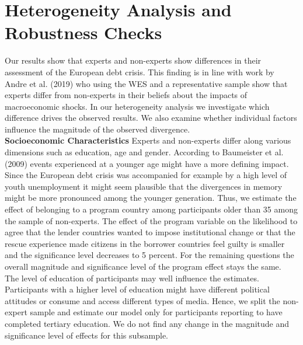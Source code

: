 \section{Heterogeneity Analysis and Robustness Checks}
Our results show that experts and non-experts show differences in their assessment of the European debt crisis. This finding is in line with work by Andre et al. (2019) who using the WES and a representative sample show that experts differ from non-experts in their beliefs about the impacts of macroeconomic shocks. In our heterogeneity analysis we investigate which difference drives the observed results. We also examine whether individual factors influence the magnitude of the observed divergence. 
\\



\textbf{Socioeconomic Characteristics}
 Experts and non-experts differ along various dimensions such as education, age and gender.
 According to Baumeister et al. (2009) events experienced at a younger age might have a more defining impact. Since the European debt crisis was accompanied for example by a high level of youth unemployment it might seem plausible that the divergences in memory might be more pronounced among the younger generation. Thus, we estimate the effect of belonging to a program country among participants older than 35 among the sample of non-experts.  The effect of the program variable on the likelihood to agree that the lender countries wanted to impose institutional change or that the rescue experience made citizens in the borrower countries feel guilty is smaller and the significance level decreases to 5 percent. For the remaining questions the overall magnitude and significance level of the program effect stays the same. 
\\
The level of education of participants may well influence the estimates. Participants with a higher level of education might have different political attitudes or consume and access different types of media. Hence, we split the non-expert sample and estimate our model only for participants reporting to have completed tertiary education. We do not find any change in the magnitude and significance level of effects for this subsample. 
\\
